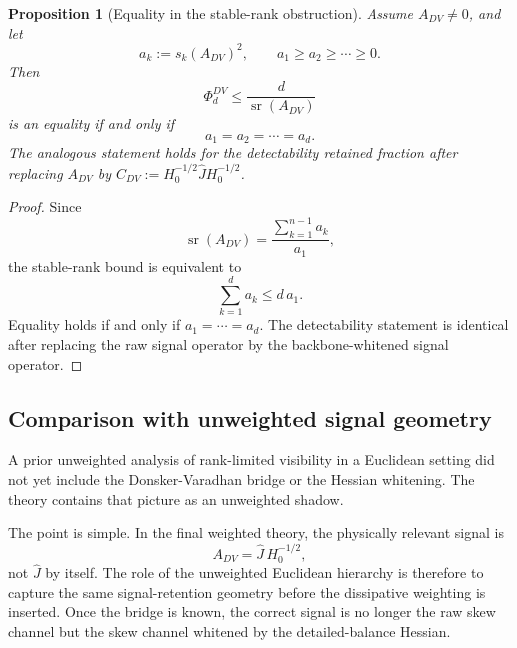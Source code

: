 \documentclass[11pt,a4paper]{article}
\numberwithin{equation}{section}
\theoremstyle{thmcompact}
\newtheorem{proposition}[theorem]{Proposition}
\theoremstyle{remark}
\begin{document}
\begin{proposition}[Equality in the stable-rank obstruction]
\label{prop:equality_stable_rank_obstruction}
Assume \(A_{DV}\neq 0\), and let
\begin{equation}
a_k:=s_k(A_{DV})^2,
\qquad
 a_1\ge a_2\ge \cdots \ge 0.
\end{equation}
Then
\begin{equation}
\Phi_d^{DV}\le \frac{d}{\operatorname{sr}(A_{DV})}
\end{equation}
is an equality if and only if
\begin{equation}
a_1=a_2=\cdots=a_d.
\end{equation}
The analogous statement holds for the detectability retained fraction after replacing \(A_{DV}\) by \(C_{DV}:=H_0^{-1/2}\widehat J H_0^{-1/2}\).
\end{proposition}

\begin{proof}
Since
\begin{equation}
\operatorname{sr}(A_{DV})=\frac{\sum_{k=1}^{n-1}a_k}{a_1},
\end{equation}
the stable-rank bound is equivalent to
\begin{equation}
\sum_{k=1}^{d}a_k\le d\,a_1.
\end{equation}
Equality holds if and only if \(a_1=\cdots=a_d\). The detectability statement is identical after replacing the raw signal operator by the backbone-whitened signal operator.
\end{proof}

\subsection{Comparison with unweighted signal geometry}

A prior unweighted analysis of rank-limited visibility in a Euclidean setting did not yet include the Donsker-Varadhan bridge or the Hessian whitening. The theory contains that picture as an unweighted shadow.

The point is simple. In the final weighted theory, the physically relevant signal is
\begin{equation}
A_{DV}=\widehat J\,H_0^{-1/2},
\end{equation}
not \(\widehat J\) by itself. The role of the unweighted Euclidean hierarchy is therefore to capture the same signal-retention geometry before the dissipative weighting is inserted. Once the bridge is known, the correct signal is no longer the raw skew channel but the skew channel whitened by the detailed-balance Hessian.
\end{document}
